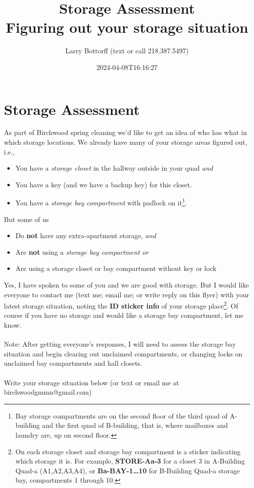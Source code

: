 \documentclass[letterpaper]{article}
\author{Larry Bottorff (text or call 218.387.5497)}
\date{2024-04-08T16:16:27}
\title{Storage Assessment\\\medskip
\large Figuring out your storage situation}
\begin{document}
\maketitle

\section*{Storage Assessment}
\label{sec:org194cf40}
As part of Birchwood spring cleaning we'd like to get an idea of who
has what in which storage locations. We already have many of your
storage areas figured out, i.e.,

\begin{itemize}
\item You have a \emph{storage closet} in the hallway outside in your quad
\emph{and}
\item You have a key (and we have a backup key) for this closet.
\item You have a \emph{storage bay compartment} with padlock on it\footnote{Bay storage compartments are on the second floor of the third quad of
A-building and the first quad of B-building, that is, where mailboxes
and laundry are, up on second floor.}.
\end{itemize}

But some of us

\begin{itemize}
\item Do \textbf{not} have any extra-apartment storage, \emph{and}
\item Are \textbf{not} using a \emph{storage bay compartment} \emph{or}
\item Are using a storage closet or bay compartment without key or lock
\end{itemize}

Yes, I have spoken to some of you and we are good with storage. But I
would like everyone to contact me (text me; email me; or write reply
on this flyer) with your latest storage situation, noting the \textbf{ID
sticker info} of your storage place\footnote{On each storage closet and storage bay compartment is a sticker
indicating which storage it is. For example, \textbf{STORE-Aa-3} for a closet 3
in A-Building Quad-a (A1,A2,A3,A4), or \textbf{Ba-BAY-1\ldots{}10} for B-Building
Quad-a storage bay, compartments 1 through 10.}. Of course if you have no
storage and would like a storage bay compartment, let me know.\\[0pt]
\\[0pt]
Note: After getting everyone's responses, I will need to assess the
storage bay situation and begin clearing out unclaimed compartments,
or changing locks on unclaimed bay compartments and hall closets. \\[0pt]
\\[0pt]
Write your storage situation below (or text or email me at
birchwoodgmmn@gmail.com)
\end{document}
